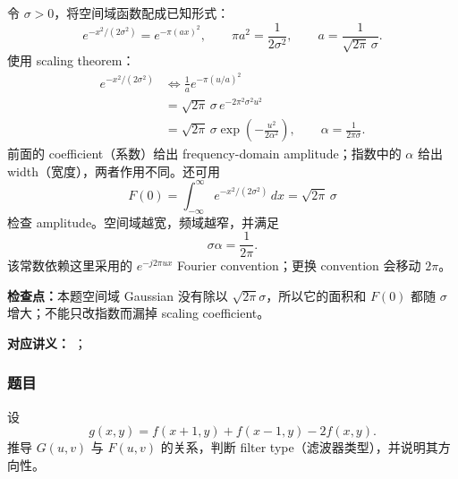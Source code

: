 \begin{checkedsolution}
令 $\sigma>0$，将空间域函数配成已知形式：
\[
  e^{-x^2/(2\sigma^2)}=e^{-\pi(ax)^2},
  \qquad
  \pi a^2=\frac1{2\sigma^2},
  \qquad
  a=\frac1{\sqrt{2\pi}\,\sigma}.
\]
使用 scaling theorem：
\begin{align*}
  e^{-x^2/(2\sigma^2)}
  &\Longleftrightarrow
  \frac1a e^{-\pi(u/a)^2}\\
  &=\sqrt{2\pi}\,\sigma\,
  e^{-2\pi^2\sigma^2u^2}\\
  &=\boxed{\sqrt{2\pi}\,\sigma
  \exp\!\left(-\frac{u^2}{2\alpha^2}\right)},
  \qquad
  \boxed{\alpha=\frac1{2\pi\sigma}}.
\end{align*}
前面的 coefficient（系数）给出 frequency-domain amplitude；指数中的 $\alpha$ 给出 width（宽度），两者作用不同。还可用
\[
  F(0)=\int_{-\infty}^{\infty}e^{-x^2/(2\sigma^2)}\,dx
  =\sqrt{2\pi}\,\sigma
\]
检查 amplitude。空间域越宽，频域越窄，并满足
\[
  \boxed{\sigma\alpha=\frac1{2\pi}}.
\]
该常数依赖这里采用的 $e^{-j2\pi ux}$ Fourier convention；更换 convention 会移动 $2\pi$。
\end{checkedsolution}

\textbf{检查点：}本题空间域 Gaussian 没有除以 $\sqrt{2\pi}\sigma$，所以它的面积和 $F(0)$ 都随 $\sigma$ 增大；不能只改指数而漏掉 scaling coefficient。


\textbf{对应讲义：}
；

\subsubsection*{题目}

设
\[
  g(x,y)=f(x+1,y)+f(x-1,y)-2f(x,y).
\]
推导 $G(u,v)$ 与 $F(u,v)$ 的关系，判断 filter type（滤波器类型），并说明其方向性。

